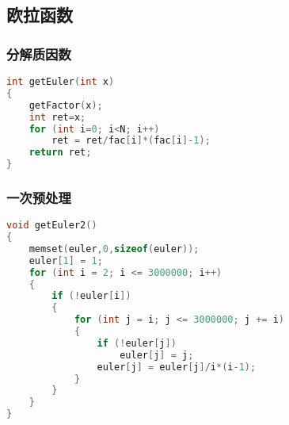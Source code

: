\subsection{欧拉函数}
	\subsubsection{分解质因数}
	\begin{lstlisting}[language=c++]
int getEuler(int x)
{
	getFactor(x);
	int ret=x;
	for (int i=0; i<N; i++)
		ret = ret/fac[i]*(fac[i]-1);
	return ret;
}
	\end{lstlisting}

	\subsubsection{一次预处理}
	\begin{lstlisting}[language=c++]
void getEuler2()
{
	memset(euler,0,sizeof(euler));
	euler[1] = 1;
	for (int i = 2; i <= 3000000; i++)
	{
		if (!euler[i])
		{
			for (int j = i; j <= 3000000; j += i)
			{
				if (!euler[j])
					euler[j] = j;
				euler[j] = euler[j]/i*(i-1);
			}
		}
	}
}
	\end{lstlisting}